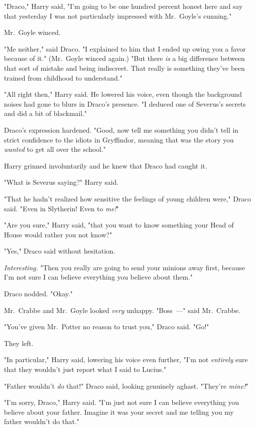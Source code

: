 "Draco," Harry said, "I'm going to be one hundred percent honest here and say
that yesterday I was not particularly impressed with Mr.~Goyle's cunning."

Mr.~Goyle winced.

"Me neither," said Draco. "I explained to him that I ended up owing you a favor
because of it." (Mr.~Goyle winced again.) "But there \emph{is} a big difference
between that sort of mistake and being indiscreet. That really is something
they've been trained from childhood to understand."

"All right then," Harry said. He lowered his voice, even though the background
noises had gone to blurs in Draco's presence. "I deduced one of Severus's
secrets and did a bit of blackmail."

Draco's expression hardened. "Good, now tell me something you didn't tell in
strict confidence to the idiots in Gryffindor, meaning that was the story you
\emph{wanted} to get all over the school."

Harry grinned involuntarily and he knew that Draco had caught it.

"What is Severus saying?" Harry said.

"That he hadn't realized how sensitive the feelings of young children were,"
Draco said. "Even in Slytherin! Even to \emph{me!}"

"Are you sure," Harry said, "that you want to know something your Head of House
would rather you not know?"

"Yes," Draco said without hesitation.

\emph{Interesting.} "Then you really are going to send your minions away first,
because I'm not sure I can believe everything you believe about them."

Draco nodded. "Okay."

Mr.~Crabbe and Mr.~Goyle looked \emph{very} unhappy. "Boss~---" said Mr.~Crabbe.

"You've given Mr.~Potter no reason to trust you," Draco said. "Go!"

They left.

"In particular," Harry said, lowering his voice even further, "I'm not
\emph{entirely} sure that they wouldn't just report what I said to Lucius."

"Father wouldn't \emph{do} that!" Draco said, looking genuinely aghast.
"They're \emph{mine!}"

"I'm sorry, Draco," Harry said. "I'm just not sure I can believe everything you
believe about your father. Imagine it was your secret and me telling you my
father wouldn't do that."

